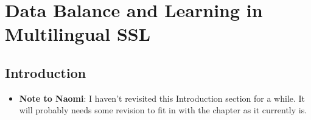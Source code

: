 

\chapter{Data Balance and Learning in Multilingual SSL}\label{chapter5}
\section{Introduction}\label{ed_sec:introduction}
\begin{itemize}
    \item \textbf{Note to Naomi}: I haven't revisited this Introduction section for a while. It will probably needs some revision to fit in with the chapter as it currently is.
\end{itemize}

